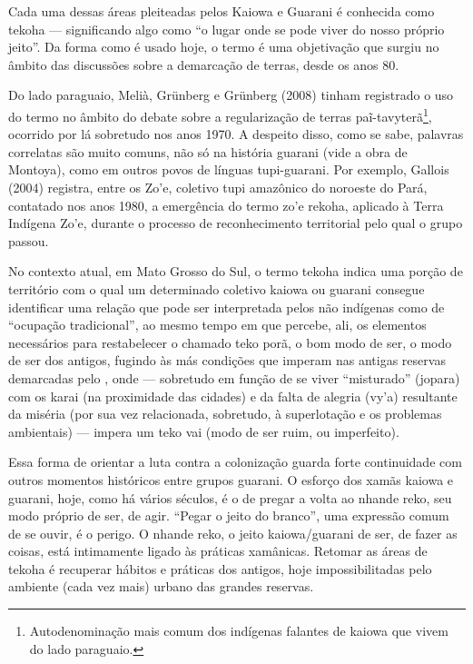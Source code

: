 Cada uma dessas áreas pleiteadas pelos Kaiowa e Guarani é conhecida como
tekoha --- significando algo como ``o lugar onde se pode viver do nosso
próprio jeito''. Da forma como é usado hoje, o termo é uma objetivação
que surgiu no âmbito das discussões sobre a demarcação de terras, desde
os anos 80. 

Do lado paraguaio, Melià, Grünberg e Grünberg (2008) tinham registrado o
uso do termo no âmbito do debate sobre a regularização de terras
paĩ{}-tavyterã\footnote{Autodenominação mais comum dos indígenas
falantes de kaiowa que vivem do lado paraguaio.}, ocorrido por lá
sobretudo nos anos 1970. A despeito disso, como se sabe, palavras
correlatas são muito comuns, não só na história guarani (vide a obra de
Montoya), como em outros povos de línguas tupi-guarani. Por exemplo,
Gallois (2004) registra, entre os Zo’e, coletivo tupi amazônico do
noroeste do Pará, contatado nos anos 1980, a emergência do termo zo’e
rekoha, aplicado à Terra Indígena Zo’e, durante o processo de
reconhecimento territorial pelo qual o grupo passou. 

No contexto atual, em Mato Grosso do Sul, o termo tekoha indica uma
porção de território com o qual um determinado coletivo kaiowa ou
guarani consegue identificar uma relação que pode ser interpretada
pelos não indígenas como de ``ocupação tradicional'', ao mesmo tempo em
que percebe, ali, os elementos necessários para restabelecer o chamado
teko porã, o bom modo de ser, o modo de ser dos antigos, fugindo às más
condições que imperam nas antigas reservas demarcadas pelo , onde ---
sobretudo em função de se viver ``misturado'' (jopara) com os karai (na
proximidade das cidades) e da falta de alegria (vy’a) resultante da
miséria (por sua vez relacionada, sobretudo, à superlotação e os
problemas ambientais) --- impera um teko vai (modo de ser ruim, ou
imperfeito).

Essa forma de orientar a luta contra a colonização guarda forte
continuidade com outros momentos históricos entre grupos guarani. O
esforço dos xamãs kaiowa e guarani, hoje, como há vários séculos, é o
de pregar a volta ao nhande reko, seu modo próprio de ser, de agir.
``Pegar o jeito do branco'', uma expressão comum de se ouvir, é o perigo.
O nhande reko, o jeito kaiowa/guarani de ser, de fazer as coisas, está
intimamente ligado às práticas xamânicas. Retomar as áreas de tekoha é
recuperar hábitos e práticas dos antigos, hoje impossibilitadas pelo
ambiente (cada vez mais) urbano das grandes reservas.

